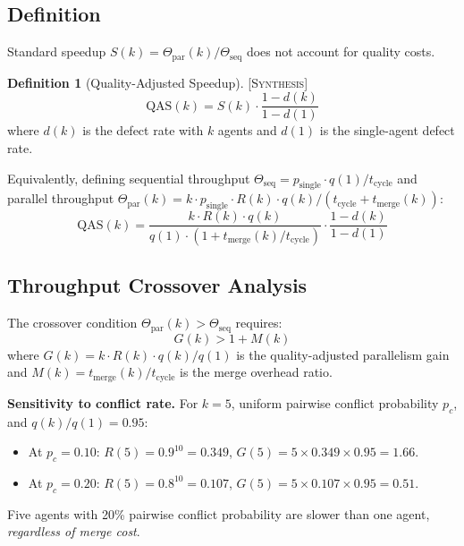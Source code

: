 \documentclass[11pt]{article}
\theoremstyle{definition}
\newtheorem{definition}[theorem]{Definition}
\theoremstyle{remark}
\newcommand{\synthesis}{\textsc{[Synthesis]}}
\begin{document}
\subsection{Definition}

Standard speedup $S(k) = \Theta_{\mathrm{par}}(k) / \Theta_{\mathrm{seq}}$ does not account for quality costs.

\begin{definition}[Quality-Adjusted Speedup] \synthesis{}
\label{def:qas}
\begin{equation}
\label{eq:qas}
  \mathrm{QAS}(k) = S(k) \cdot \frac{1 - d(k)}{1 - d(1)}
\end{equation}
where $d(k)$ is the defect rate with $k$ agents and $d(1)$ is the single-agent defect rate.
\end{definition}

Equivalently, defining sequential throughput $\Theta_{\mathrm{seq}} = p_{\mathrm{single}} \cdot q(1) / t_{\mathrm{cycle}}$ and parallel throughput $\Theta_{\mathrm{par}}(k) = k \cdot p_{\mathrm{single}} \cdot R(k) \cdot q(k) / (t_{\mathrm{cycle}} + t_{\mathrm{merge}}(k))$:
\begin{equation}
  \mathrm{QAS}(k) = \frac{k \cdot R(k) \cdot q(k)}{q(1) \cdot (1 + t_{\mathrm{merge}}(k)/t_{\mathrm{cycle}})} \cdot \frac{1 - d(k)}{1 - d(1)}
\end{equation}

\subsection{Throughput Crossover Analysis}

The crossover condition $\Theta_{\mathrm{par}}(k) > \Theta_{\mathrm{seq}}$ requires:
\begin{equation}
  G(k) > 1 + M(k)
\end{equation}
where $G(k) = k \cdot R(k) \cdot q(k)/q(1)$ is the quality-adjusted parallelism gain and $M(k) = t_{\mathrm{merge}}(k)/t_{\mathrm{cycle}}$ is the merge overhead ratio.

\textbf{Sensitivity to conflict rate.}
For $k = 5$, uniform pairwise conflict probability $p_c$, and $q(k)/q(1) = 0.95$:
\begin{itemize}[nosep]
  \item At $p_c = 0.10$: $R(5) = 0.9^{10} = 0.349$, $G(5) = 5 \times 0.349 \times 0.95 = 1.66$.
  \item At $p_c = 0.20$: $R(5) = 0.8^{10} = 0.107$, $G(5) = 5 \times 0.107 \times 0.95 = 0.51$.
\end{itemize}
Five agents with 20\% pairwise conflict probability are slower than one agent, \emph{regardless of merge cost}.
\end{document}
